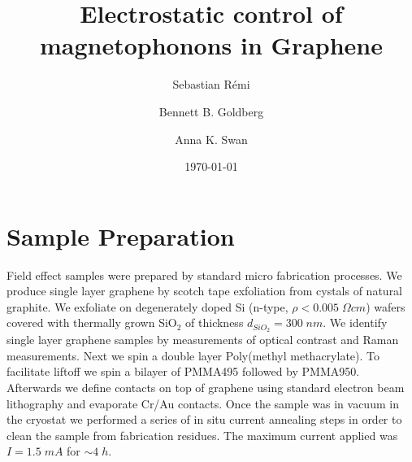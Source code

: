 \documentclass[pra,aps,superscriptaddress,preprint]{revtex4-1}
\begin{document}
\title{Electrostatic control of magnetophonons in Graphene} %

\author{Sebastian R\'{e}mi}

\author{Bennett B. Goldberg}


\author{Anna K. Swan}


\date{\today}



\pacs{}%

\maketitle %

\section{Sample Preparation}
Field effect samples were prepared by standard micro fabrication processes. We produce single layer graphene by scotch tape exfoliation from cystals of natural graphite. We exfoliate on degenerately doped Si (n-type, $\rho < 0.005\; \Omega cm$) wafers covered with thermally grown SiO$_2$ of thickness $d_{SiO_2}=300\; nm$. We identify single layer graphene samples by measurements of optical contrast and Raman measurements. Next we spin a double layer Poly(methyl methacrylate). To facilitate liftoff we spin a bilayer of PMMA495 followed by PMMA950. Afterwards we define contacts on top of graphene using standard electron beam lithography and evaporate Cr/Au contacts. 
Once the sample was in vacuum in the cryostat we performed a series of in situ current annealing steps in order to clean the sample from fabrication residues. The maximum current applied was $I=1.5\; mA$ for $\sim 4\;h$.
\end{document}
